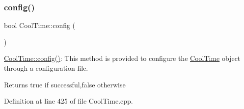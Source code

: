\subsubsection{\texorpdfstring{config()}{config()}\hspace{0.1cm}{\footnotesize\ttfamily [1/2]}}
{\footnotesize\ttfamily bool Cool\+Time\+::config (\begin{DoxyParamCaption}{ }\end{DoxyParamCaption})}

\hyperlink{class_cool_time_a87c28260c1bc77091162cbcf1ee2e129}{Cool\+Time\+::config()}\+: This method is provided to configure the \hyperlink{class_cool_time}{Cool\+Time} object through a configuration file.

\begin{DoxyReturn}{Returns}
true if successful,false otherwise 
\end{DoxyReturn}


Definition at line 425 of file Cool\+Time.\+cpp.


